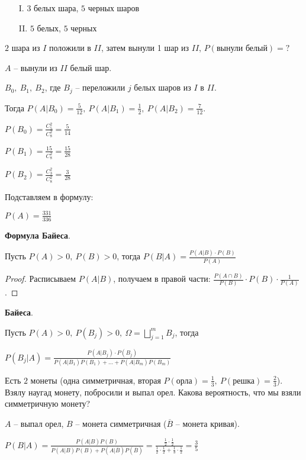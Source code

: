 \begin{example}
    \begin{enumerate}
        \item[I.] $3$ белых шара, $5$ черных шаров
        \item[II.] $5$ белых, $5$ черных  
    \end{enumerate}

    $2$ шара из $I$ положили в $II$, затем вынули 1 шар из $II$, $P(\text{вынули белый}) = ?$

    $A$ -- вынули из $II$ белый шар.

    $B_0, \ B_1, \ B_2$, где $B_j$ -- переложили $j$ белых шаров из $I$ в $II$.

    Тогда $P(A | B_0) = \frac{5}{12}, \ P(A | B_1) = \frac{1}{2}, \ P(A | B_2) = \frac{7}{12}$.
    
    $P(B_0) = \frac{C_5^2}{C_8^2} = \frac{5}{14}$

    $P(B_1) = \frac{15}{C_8^2} = \frac{15}{28}$
    
    $P(B_2) = \frac{C_3^2}{C_8^2} = \frac{3}{28}$

    Подставляем в формулу:

    $P(A) = \frac{331}{336}$
\end{example}

\begin{theorem}
    \textbf{Формула Байеса}.

    Пусть $P(A) > 0, \ P(B) > 0$, тогда $P(B | A) = \frac{P(A | B) \cdot P(B)}{P(A)}$
\end{theorem}
\begin{proof}
    Расписываем $P(A | B)$, получаем в правой части: $\frac{P(A \cap B)}{P(B)} \cdot P(B) \cdot \frac{1}{P(A)}$.
\end{proof}

\begin{theorem}
    \textbf{Байеса}.

    Пусть $P(A) > 0, \ P(B_j) > 0, \ \Omega = \bigsqcup_{j=1}^{m} B_j$, тогда 

    $P(B_j | A) = \frac{P(A | B_j) \cdot P(B_j)}{P(A|B_1) P(B_1) + \dots + P(A|B_m) P(B_m)}$
\end{theorem}

\begin{example}
    Есть $2$ монеты (одна симметричная, вторая $P(\text{орла}) = \frac{1}{3}, \ P(\text{решка}) = \frac{2}{3}$). Взялу наугад монету, побросили и выпал орел. Какова вероятность, что мы взяли симметричную монету?

    $A$ -- выпал орел, $B$ -- монета симметричная ($\overline{B}$ -- монета кривая).

    $P(B | A) = \frac{P(A | B) P(B)}{P(A|B) P(B) + P(A | \overline{B}) P(\overline{B})} = \frac{\frac{1}{2} \cdot \frac{1}{2}}{\frac{1}{2} \cdot \frac{1}{2} + \frac{1}{3} \cdot \frac{1}{2}} = \frac{3}{5}$
\end{example}



